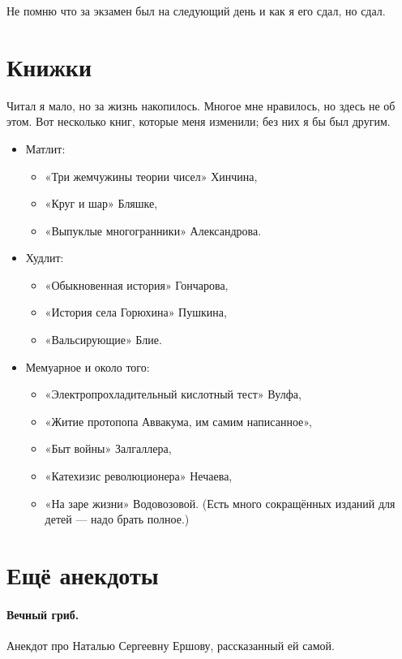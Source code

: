 \documentclass{book}
\begin{document}
Не помню что за экзамен был на следующий день и как я его сдал, но сдал.

\section*{Книжки}

Читал я мало, но за жизнь накопилось.
Многое мне нравилось, но здесь не об этом.
Вот несколько книг, которые меня изменили; без них я бы был другим.
\begin{itemize}
\item Матлит:
\begin{itemize}
\item «Три жемчужины теории чисел» Хинчина,
\item «Круг и шар» Бляшке,
\item «Выпуклые многогранники» Александрова.
\end{itemize}

\item Худлит:
\begin{itemize}
\item «Обыкновенная история» Гончарова,
\item «История села Горюхина» Пушкина,
\item «Вальсирующие» Блие.
\end{itemize}

\item Мемуарное и около того:
\begin{itemize}
\item «Электропрохладительный кислотный тест» Вулфа,
\item «Житие протопопа Аввакума, им самим написанное»,
\item «Быт войны» Залгаллера,
\item «Катехизис революционера» Нечаева,
\item «На заре жизни» Водовозовой. (Есть много сокращённых изданий для детей --- надо брать полное.)
\end{itemize} 

\end{itemize}

\section*{Ещё анекдоты}

\paragraph{Вечный гриб.}
Анекдот про Наталью Сергеевну Ершову, рассказанный ей самой.
\end{document}
